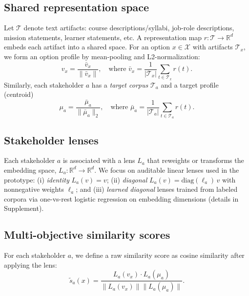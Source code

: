 \documentclass{article}
\begin{document}
\subsection{Shared representation space}
Let $\mathcal{T}$ denote text artifacts: course descriptions/syllabi, job-role descriptions, mission statements, learner statements, etc. A representation map  $r:\mathcal{T}\to\mathbb{R}^d$ embeds each artifact into a shared space. For an option $x\in\mathcal{X}$ with artifacts $\mathcal{T}_x$, we form an option profile by mean-pooling and L2-normalization:
\begin{equation}
  v_x = \frac{\bar{v}_x}{\|\bar{v}_x\|}, \quad \text{where } \bar{v}_x = \frac{1}{|\mathcal{T}_x|}\sum_{t\in\mathcal{T}_x} r(t).
\end{equation}
Similarly, each stakeholder $a$ has a \emph{target corpus} $\mathcal{T}_a$ and a target profile (centroid)
\begin{equation}
  \mu_a = \frac{\bar{\mu}_a}{\|\bar{\mu}_a\|_2}, \quad \text{where } \bar{\mu}_a = \frac{1}{|\mathcal{T}_a|}\sum_{t\in\mathcal{T}_a} r(t).
\end{equation}

\subsection{Stakeholder lenses}
Each stakeholder $a$ is associated with a lens $L_a$ that reweights or transforms the embedding space, $L_a:\mathbb{R}^d \to \mathbb{R}^d.$
We focus on auditable linear lenses used in the prototype:
(i) \emph{identity} $L_a(v)=v$;
(ii) \emph{diagonal} $L_a(v)=\mathrm{diag}(\ell_a)\,v$ with nonnegative weights $\ell_a$; and
(iii) \emph{learned diagonal} lenses trained from labeled corpora via one-vs-rest logistic regression on embedding dimensions (details in Supplement).

\subsection{Multi-objective similarity scores}
\label{subsec:scores}
For each stakeholder $a$, we define a raw similarity score as cosine similarity after applying the lens:
\begin{equation}
  \tilde{s}_a(x) = \frac{L_a(v_x) \cdot L_a(\mu_a)}{\|L_a(v_x)\| \|L_a(\mu_a)\|}.
\end{equation}
\end{document}

